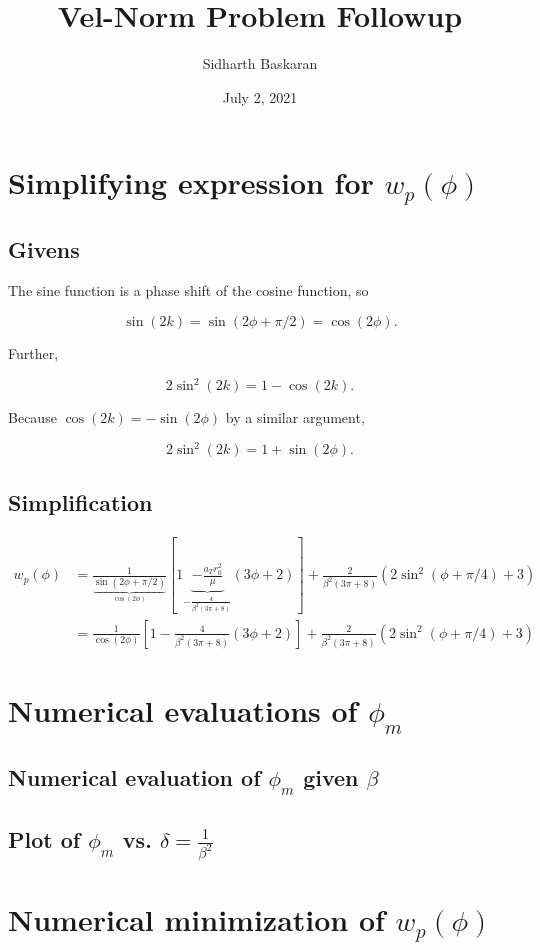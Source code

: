 \documentclass[11pt]{article}
\title{Vel-Norm Problem Followup}
\author{Sidharth Baskaran}
\date{July 2, 2021}
\begin{document}

\maketitle

\section{Simplifying expression for $w_p(\phi)$}

\subsection{Givens}

The sine function is a phase shift of the cosine function, so 

\begin{equation}
    \sin(2k)=\sin(2\phi+\pi/2)=\cos(2\phi).
\end{equation}

Further,

\begin{equation}
    2\sin^2(2k)=1-\cos(2k).
\end{equation}

Because $\cos(2k)=-\sin(2\phi)$ by a similar argument, 

\begin{equation}
    2\sin^2(2k)=1+\sin(2\phi).
\end{equation}

\subsection{Simplification}

\begin{align}
    w_p(\phi)&=\frac{1}{\underbrace{\sin(2\phi+\pi/2)}_{\cos(2\phi)}}[1\underbrace{-\frac{a_Tr_0^2}{\mu}}_{-\frac{4}{\beta^2(3\pi+8)}}(3\phi+2)]+\frac{2}{\beta^2(3\pi+8)}(2\sin^2(\phi+\pi/4)+3)\\
    &=\frac{1}{\cos(2\phi)}\left[1-\frac{4}{\beta^2(3\pi+8)}(3\phi+2)\right]+\frac{2}{\beta^2(3\pi+8)}(2\sin^2(\phi+\pi/4)+3)
\end{align}

\section{Numerical evaluations of $\phi_m$}

\subsection{Numerical evaluation of $\phi_m$ given $\beta$}

\subsection{Plot of $\phi_m$ vs. $\delta=\frac{1}{\beta^2}$}

\section{Numerical minimization of $w_p(\phi)$}

\end{document}
